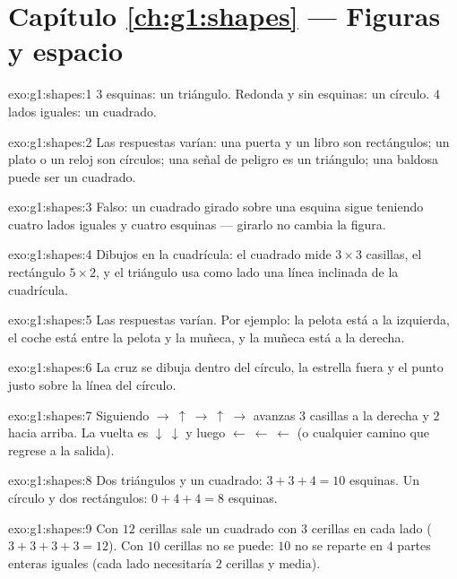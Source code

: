 \section*{Capítulo \ref{ch:g1:shapes} --- Figuras y espacio}

\begin{solution}{exo:g1:shapes:1}
$3$ esquinas: un triángulo. Redonda y sin esquinas: un círculo. $4$ lados
iguales: un cuadrado.
\end{solution}

\begin{solution}{exo:g1:shapes:2}
Las respuestas varían: una puerta y un libro son rectángulos; un plato o un reloj
son círculos; una señal de peligro es un triángulo; una baldosa puede ser un
cuadrado.
\end{solution}

\begin{solution}{exo:g1:shapes:3}
Falso: un cuadrado girado sobre una esquina sigue teniendo cuatro lados iguales y
cuatro esquinas --- girarlo no cambia la figura.
\end{solution}

\begin{solution}{exo:g1:shapes:4}
Dibujos en la cuadrícula: el cuadrado mide $3 \times 3$ casillas, el rectángulo
$5 \times 2$, y el triángulo usa como lado una línea inclinada de la
cuadrícula.
\end{solution}

\begin{solution}{exo:g1:shapes:5}
Las respuestas varían. Por ejemplo: la pelota está a la izquierda, el coche está entre
la pelota y la muñeca, y la muñeca está a la derecha.
\end{solution}

\begin{solution}{exo:g1:shapes:6}
La cruz se dibuja dentro del círculo, la estrella fuera y el punto
justo sobre la línea del círculo.
\end{solution}

\begin{solution}{exo:g1:shapes:7}
Siguiendo $\to\ \uparrow\ \to\ \uparrow\ \to$ avanzas $3$ casillas
a la derecha y $2$ hacia arriba. La vuelta es $\downarrow\ \downarrow$ y luego
$\leftarrow\ \leftarrow\ \leftarrow$ (o cualquier camino que regrese a la
salida).
\end{solution}

\begin{solution}{exo:g1:shapes:8}
Dos triángulos y un cuadrado: $3 + 3 + 4 = 10$ esquinas. Un círculo
y dos rectángulos: $0 + 4 + 4 = 8$ esquinas.
\end{solution}

\begin{solution}{exo:g1:shapes:9}
Con $12$ cerillas sale un cuadrado con $3$ cerillas en cada lado
($3 + 3 + 3 + 3 = 12$). Con $10$ cerillas no se puede: $10$
no se reparte en $4$ partes enteras iguales (cada lado necesitaría
$2$ cerillas y media).
\end{solution}
